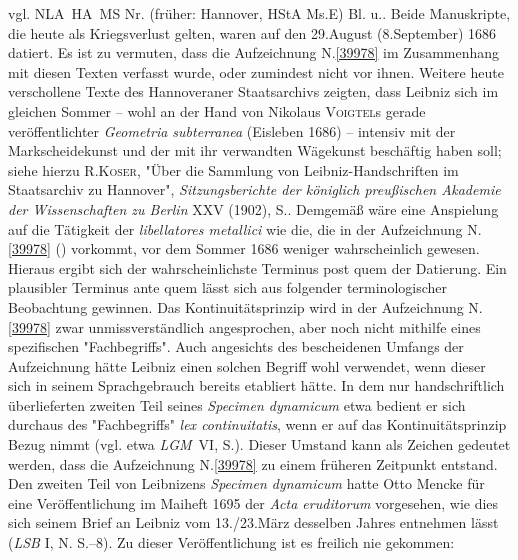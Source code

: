 vgl. NLA~HA~MS Nr. (früher: Hannover, HStA Ms.\;E) Bl. u..\cite{02553}\cite{02554}
Beide Manuskripte, die heute als Kriegsverlust gelten,
waren auf den 29.\;August (8.\;September) 1686 datiert.
Es ist zu vermuten,
dass die Aufzeichnung N.\;\ref{39978} im Zusammenhang mit diesen Texten verfasst wurde, oder zumindest nicht vor ihnen.
Weitere heute verschollene Texte des Hannoveraner Staatsarchivs zeigten, dass Leibniz sich im gleichen Sommer -- wohl an der Hand von Nikolaus \textsc{Voigtel}s gerade veröffentlichter \textit{Geometria subterranea} (Eisleben 1686)\cite{02556} -- intensiv mit der Markscheidekunst und der mit ihr verwandten Wägekunst beschäftig haben soll;
siehe hierzu \textsc{R.\;Koser}, "Über die Sammlung von Leibniz-Handschriften im Staatsarchiv zu Hannover",
\ledpb%
\textit{Sitzungsberichte der königlich preußischen Akademie der Wissenschaften zu Berlin} XXV (1902), S..\cite{02555}
Demgemäß wäre eine Anspielung auf die Tätigkeit der \textit{libellatores metallici} wie die, die in der Aufzeichnung N.\;\ref{39978} () vorkommt, vor dem Sommer 1686 weniger wahrscheinlich gewesen.
Hieraus ergibt sich der wahrscheinlichste Terminus post quem der Datierung.%
\pend%
\pstart%
Ein plausibler Terminus ante quem lässt sich aus folgender terminologischer Beobachtung gewinnen.
Das Kontinuitätsprinzip wird in der Aufzeichnung N.\;\ref{39978} zwar unmissverständlich angesprochen, aber noch nicht mithilfe eines spezifischen "Fachbegriffs".
Auch angesichts des bescheidenen Umfangs der Aufzeichnung hätte Leibniz einen solchen Begriff wohl verwendet, wenn dieser sich in seinem Sprachgebrauch bereits etabliert hätte.
In dem nur handschriftlich überlieferten zweiten Teil seines \textit{Specimen dynamicum} etwa bedient er sich durchaus des "Fachbegriffs" \textit{lex continuitatis}, wenn er auf das Kontinuitätsprinzip Bezug nimmt (vgl. etwa \textit{LGM}~VI, S.).\cite{02557}\cite{01043}
Dieser Umstand kann als Zeichen gedeutet werden, dass die Aufzeichnung N.\;\ref{39978} zu einem früheren Zeitpunkt entstand.
Den zweiten Teil von Leibnizens \textit{Specimen dynamicum} hatte Otto Mencke für eine Veröffentlichung im Maiheft 1695 der \textit{Acta eruditorum} vorgesehen,\cite{01023} wie dies sich seinem Brief an Leibniz vom 13./23.\;März desselben Jahres entnehmen lässt (\textit{LSB} I, N. S.--8).\cite{02558}
Zu dieser Veröffentlichung ist es freilich nie gekommen:
